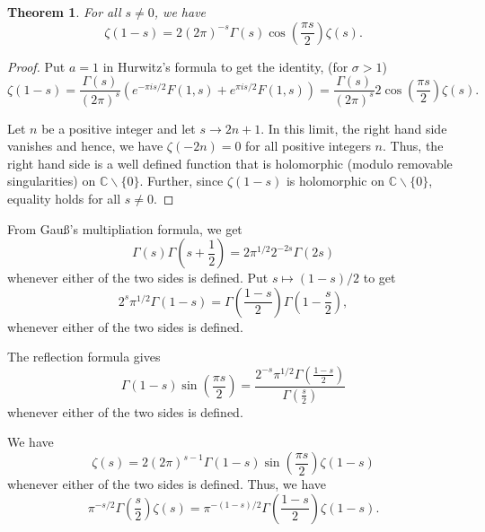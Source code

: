 \documentclass[12pt]{article}
\theoremstyle{thmstyle}
\newtheorem{theorem}{Theorem}[section]
\theoremstyle{defstyle}
\newcommand{\bbC}{\mathbb{C}}
\begin{document}
\begin{theorem}
    For all $s\ne 0$, we have 
    \begin{equation*}
        \zeta(1 - s) = 2(2\pi)^{-s}\Gamma(s)\cos\left(\frac{\pi s}{2}\right)\zeta(s).
    \end{equation*}
\end{theorem}
\begin{proof}
    Put $a = 1$ in Hurwitz's formula to get the identity, (for $\sigma > 1$)
    \begin{equation*}
        \zeta(1 - s) = \frac{\Gamma(s)}{(2\pi)^s}\left(e^{-\pi is/2}F(1, s) + e^{\pi is/2}F(1, s)\right) = \frac{\Gamma(s)}{(2\pi)^s}2\cos\left(\frac{\pi s}{2}\right)\zeta(s).
    \end{equation*}

    Let $n$ be a positive integer and let $s\to 2n + 1$. In this limit, the right hand side vanishes and hence, we have $\zeta(-2n) = 0$ for all positive integers $n$. Thus, the right hand side is a well defined function that is holomorphic (modulo removable singularities) on $\bbC\backslash\{0\}$. Further, since $\zeta(1 - s)$ is holomorphic on $\bbC\backslash\{0\}$, equality holds for all $s\ne 0$.
\end{proof}

From Gau\ss's multipliation formula, we get 
\begin{equation*}
    \Gamma(s)\Gamma\left(s + \frac{1}{2}\right) = 2\pi^{1/2}2^{-2s}\Gamma(2s)
\end{equation*}
whenever either of the two sides is defined. Put $s\mapsto(1 - s)/2$ to get 
\begin{equation*}
    2^s\pi^{1/2}\Gamma(1 - s) = \Gamma\left(\frac{1 - s}{2}\right)\Gamma\left(1 - \frac{s}{2}\right),
\end{equation*}
whenever either of the two sides is defined.

The reflection formula gives 
\begin{equation*}
    \Gamma(1 - s)\sin\left(\frac{\pi s}{2}\right) = \frac{2^{-s}\pi^{1/2}\Gamma\left(\frac{1 - s}{2}\right)}{\Gamma\left(\frac{s}{2}\right)}
\end{equation*}
whenever either of the two sides is defined.

We have 
\begin{equation*}
    \zeta(s) = 2(2\pi)^{s - 1}\Gamma(1 - s)\sin\left(\frac{\pi s}{2}\right)\zeta(1 - s)
\end{equation*}
whenever either of the two sides is defined. Thus, we have 
\begin{equation*}
    \pi^{-s/2}\Gamma\left(\frac{s}{2}\right)\zeta(s) = \pi^{-(1 - s)/2}\Gamma\left(\frac{1 - s}{2}\right)\zeta(1 - s).
\end{equation*}
\end{document}
